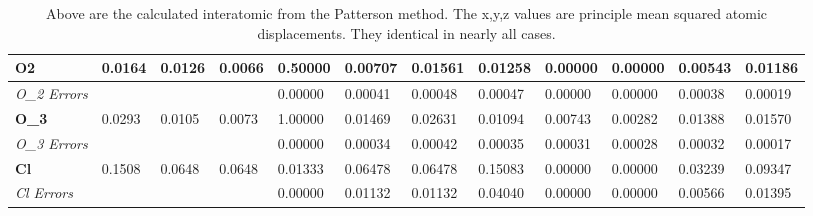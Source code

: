 \documentclass[]{scrartcl}
\begin{document}
\begin{table}[]
\begin{tabular}{|l|l|l|l|l|l|l|l|l|l|l|l|}
		\textbf{O2}                         & 0.0164                          & 0.0126                          & 0.0066                          & 0.50000                           & 0.00707                           & 0.01561                           & 0.01258                           & 0.00000                           & 0.00000                           & 0.00543                           & 0.01186                           \\ \hline
		\textit{O\_2 Errors}                           &                                 &                                 &                                 & 0.00000                           & 0.00041                           & 0.00048                           & 0.00047                           & 0.00000                           & 0.00000                           & 0.00038                           & 0.00019                           \\ \hline
		\textbf{O\_3}                         & 0.0293                          & 0.0105                          & 0.0073                          & 1.00000                           & 0.01469                           & 0.02631                           & 0.01094                           & 0.00743                           & 0.00282                           & 0.01388                           & 0.01570                           \\ \hline
		\textit{O\_3 Errors}                           &                                 &                                 &                                 & 0.00000                           & 0.00034                           & 0.00042                           & 0.00035                           & 0.00031                           & 0.00028                           & 0.00032                           & 0.00017                           \\ \hline
		\textbf{Cl}                         & 0.1508                          & 0.0648                          & 0.0648                          & 0.01333                           & 0.06478                           & 0.06478                           & 0.15083                           & 0.00000                           & 0.00000                           & 0.03239                           & 0.09347                           \\ \hline
		\textit{Cl Errors}
		&                                 &                                 &                                 & 0.00000                           & 0.01132                           & 0.01132                           & 0.04040                           & 0.00000                           & 0.00000                           & 0.00566                           & 0.01395                           \\ \hline
	\end{tabular}
	\caption{Above are the calculated interatomic from the Patterson method. The x,y,z values are principle mean squared atomic displacements. They identical in nearly all cases.}
\end{table}
\end{document}
